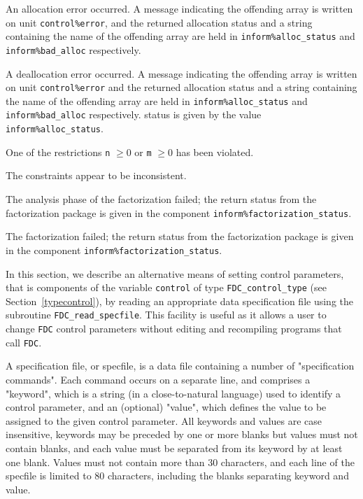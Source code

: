 \documentclass{galahad}
\newcommand{\packagename}{FDC}
\begin{document}
\begin{description}

 An allocation error occurred.
A message indicating the offending
array is written on unit {\tt control\%error}, and the returned allocation
status and a string containing the name of the offending array
are held in {\tt inform\%alloc\_\-status}
and {\tt inform\%bad\_alloc} respectively.

 A deallocation error occurred.
A message indicating the offending
array is written on unit {\tt control\%error} and the returned allocation
status and a string containing the name of the offending array
are held in {\tt inform\%alloc\_\-status}
and {\tt inform\%bad\_alloc} respectively.
status is given by the value {\tt inform\%alloc\_status}.

 One of the restrictions
{\tt n} $\geq 0$ or {\tt m} $\geq  0$
    has been violated.

\itt{\galerrprimalinfeasible} The constraints appear to be inconsistent.

 The analysis phase of the factorization failed;
    the return status from the factorization
    package is given in the component {\tt inform\%fac\-t\-orization\_status}.

 The factorization failed;
 the return status from the factorization
    package is given in the component {\tt inform\%fac\-t\-orization\_status}.

\end{description}


\galfeatures
\noindent In this section, we describe an alternative means of setting
control parameters, that is components of the variable {\tt control} of type
{\tt \packagename\_control\_type}
(see Section~\ref{typecontrol}),
by reading an appropriate data specification file using the
subroutine {\tt \packagename\_read\_specfile}. This facility
is useful as it allows a user to change  {\tt \packagename} control parameters
without editing and recompiling programs that call {\tt \packagename}.

A specification file, or specfile, is a data file containing a number of
"specification commands". Each command occurs on a separate line,
and comprises a "keyword",
which is a string (in a close-to-natural language) used to identify a
control parameter, and
an (optional) "value", which defines the value to be assigned to the given
control parameter. All keywords and values are case insensitive,
keywords may be preceded by one or more blanks but
values must not contain blanks, and
each value must be separated from its keyword by at least one blank.
Values must not contain more than 30 characters, and
each line of the specfile is limited to 80 characters,
including the blanks separating keyword and value.
\end{document}
